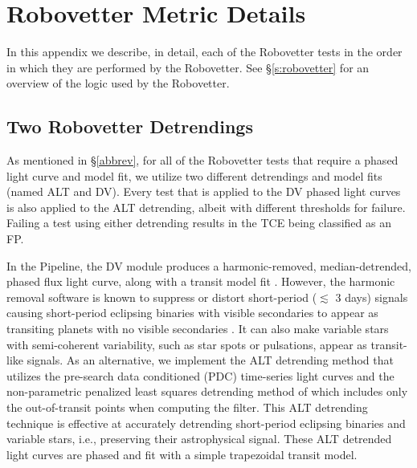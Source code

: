\section{Robovetter Metric Details}
\label{s:metrics}
In this appendix we describe, in detail, each of the Robovetter tests in the order in which they are performed by the Robovetter. See \S\ref{s:robovetter} for an overview of the logic used by the Robovetter.

\subsection{Two Robovetter Detrendings}
As mentioned in \S\ref{abbrev}, for all of the Robovetter tests that require a phased light curve and model fit, we utilize two different detrendings and model fits (named ALT and DV). Every test that is applied to the DV phased light curves is also applied to the ALT detrending, albeit with different thresholds for failure. Failing a test using either detrending results in the TCE being classified as an FP.

In the \kepler{} Pipeline, the DV module produces a harmonic-removed, median-detrended, phased flux light curve, along with a transit model fit \citep{JenkinsKDPH,Wu2010}. However, the harmonic removal software is known to suppress or distort short-period ($\lesssim$ 3 days) signals causing short-period eclipsing binaries with visible secondaries to appear as transiting planets with no visible secondaries \citep{Christiansen2013b}. It can also make variable stars with semi-coherent variability, such as star spots or pulsations, appear as transit-like signals. As an alternative, we implement the ALT detrending method that utilizes the pre-search data conditioned (PDC) time-series light curves and the non-parametric penalized least squares detrending method of \citet{Garcia2010} which includes only the out-of-transit points when computing the filter. This ALT detrending technique is effective at accurately detrending short-period eclipsing binaries and variable stars, i.e., preserving their astrophysical signal.  These ALT detrended light curves are phased and fit with a simple trapezoidal transit model. 



